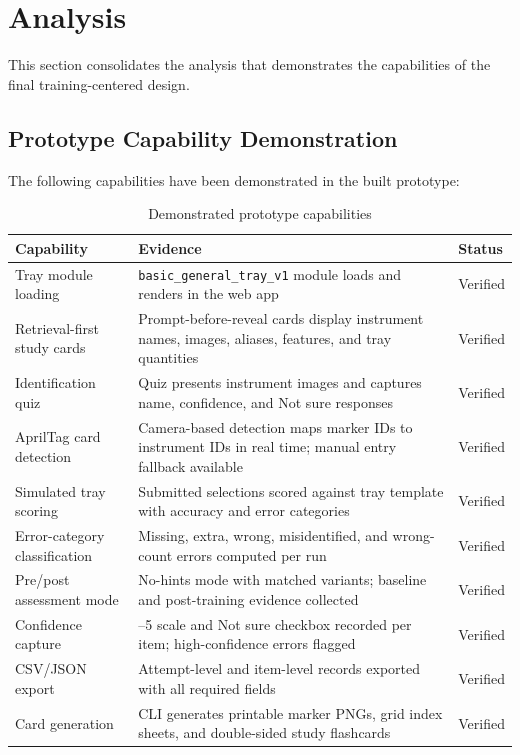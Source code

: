 \documentclass[10pt,a4paper]{article}
\begin{document}

\section{Analysis}
\label{sec:analysis}

This section consolidates the analysis that demonstrates the capabilities of the
final training-centered design.

\subsection{Prototype Capability Demonstration}
\label{sec:prototype-capability-demonstration}

The following capabilities have been demonstrated in the built prototype:

\begin{table}[H]
\centering
\caption{Demonstrated prototype capabilities}
\label{tab:demonstrated-prototype-capabilities}
\small\renewcommand{\arraystretch}{1.2}\setlength{\tabcolsep}{4pt}
\begin{tabularx}{\textwidth}{|>{\raggedright\arraybackslash}X|>{\raggedright\arraybackslash}X|>{\raggedright\arraybackslash}X|}
\hline
Capability & Evidence & Status \\
\hline
Tray module loading & \texttt{basic\_general\_tray\_v1} module loads and renders in the web app & Verified \\
\hline
Retrieval-first study cards & Prompt-before-reveal cards display instrument names, images, aliases, features, and tray quantities & Verified \\
\hline
Identification quiz & Quiz presents instrument images and captures name, confidence, and Not sure responses & Verified \\
\hline
AprilTag card detection & Camera-based detection maps marker IDs to instrument IDs in real time; manual entry fallback available & Verified \\
\hline
Simulated tray scoring & Submitted selections scored against tray template with accuracy and error categories & Verified \\
\hline
Error-category classification & Missing, extra, wrong, misidentified, and wrong-count errors computed per run & Verified \\
\hline
Pre/post assessment mode & No-hints mode with matched variants; baseline and post-training evidence collected & Verified \\
\hline
Confidence capture & 1--5 scale and Not sure checkbox recorded per item; high-confidence errors flagged & Verified \\
\hline
CSV/JSON export & Attempt-level and item-level records exported with all required fields & Verified \\
\hline
Card generation & CLI generates printable marker PNGs, grid index sheets, and double-sided study flashcards & Verified \\
\hline
\end{tabularx}
\end{table}
\end{document}
